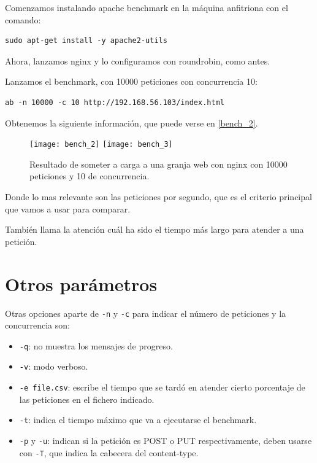Comenzamos instalando apache benchmark en la máquina anfitriona con el comando:

\begin{verbatim}
sudo apt-get install -y apache2-utils
\end{verbatim}

Ahora, lanzamos nginx y lo configuramos con roundrobin, como antes.

Lanzamos el benchmark, con 10000 peticiones con concurrencia 10:

\begin{verbatim}
ab -n 10000 -c 10 http://192.168.56.103/index.html
\end{verbatim}

Obtenemos la siguiente información, que puede verse en \eqref{bench_2}.

\begin{figure}[h!]
\begin{center}
\caption{Resultado de someter a carga a una granja web con nginx con 10000 peticiones y 10 de concurrencia.}
\label{bench_2}
\texttt{[image: bench\_2]}
\texttt{[image: bench\_3]}
\end{center}
\end{figure}

Donde lo mas relevante son las peticiones por segundo, que es el criterio principal que vamos a usar para comparar.

También llama la atención cuál ha sido el tiempo más largo para atender a una petición.

\section{Otros parámetros}

Otras opciones aparte de \verb|-n| y \verb|-c| para indicar el número de peticiones y la concurrencia son:
\begin{itemize}
\item \verb|-q|: no muestra los mensajes de progreso.
\item \verb|-v|: modo verboso.
\item \verb|-e file.csv|: escribe el tiempo que se tardó en atender cierto porcentaje de las peticiones en el fichero indicado.
\item \verb|-t|: indica el tiempo máximo que va a ejecutarse el benchmark.
\item \verb|-p| y \verb|-u|: indican si la petición es POST o PUT respectivamente, deben usarse con \verb|-T|, que indica la cabecera del content-type.
\end{itemize}

